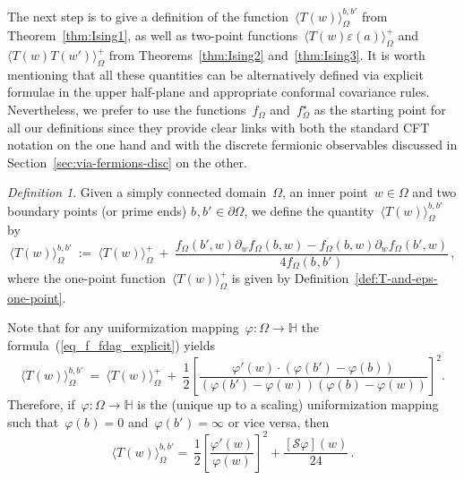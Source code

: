 \documentclass[reqno,11pt,a4paper]{amsart}
\theoremstyle{remark}
\newtheorem{definition}[proposition]{Definition}
\newcommand{\schw}{\mathcal{S}}
\renewcommand{\H}{\mathbb{H}}
\newcommand{\dob}{{b,b'}}
\newcommand{\f}{f_{\Omega}}
\newcommand{\fstar}{f_{\Omega}^\star}
\newcommand\Corr[1]{\langle #1 \rangle}
\newcommand\CorrO[2][+]{\Corr{#2}_\Omega^{#1}}
\begin{document}
The next step is to give a definition of the function~$\CorrO[\dob]{T(w)}$ from Theorem~\ref{thm:Ising1}, as well as two-point functions~$\CorrO{T(w)\varepsilon(a)}$ and~$\CorrO{T(w)T(w')}$ from Theorems~\ref{thm:Ising2} and~\ref{thm:Ising3}. It is worth mentioning that all these quantities can be alternatively defined via explicit formulae in the upper half-plane and appropriate conformal covariance rules. Nevertheless, we prefer to use the functions~$\f$ and~$\fstar$ as the starting point for all our definitions since they provide clear links with both the standard CFT notation on the one hand and with the discrete fermionic observables discussed in Section~\ref{sec:via-fermions-disc} on the other.

\begin{definition} \label{def:T-Dobrushin-expectation} Given a simply connected domain~$\Omega$, an inner point~$w\in\Omega$ and two boundary points (or prime ends) $b_{},b'_{}\in\partial\Omega$, we define the quantity~$\CorrO[\dob]{T(w)}$ by
\[
\CorrO[\dob]{T (w)} ~:=~
\CorrO{T(w)} ~+~ \frac{\f(b',w)\partial_w\f(b,w)-\f(b,w)\partial_w\f(b',w)}{4\f(b_{},b'_{})}\,,
\]
where %
the one-point function~$\CorrO{T(w)}$ is given by Definition~\ref{def:T-and-eps-one-point}.
\end{definition}

Note that for any uniformization mapping~$\varphi:\Omega\to\H$ the formula~(\ref{eq_f_fdag_explicit}) yields
\[
\CorrO[\dob]{T (w)} ~=~ \CorrO{T(w)} ~+~ \frac{1}{2}\left[\frac{\varphi'(w)\cdot(\varphi(b')-\varphi(b))} {(\varphi(b')-\varphi(w))(\varphi(b)-\varphi(w))}\right]^2.
\]
Therefore, if~$\varphi:\Omega\to\H$ is the (unique up to a scaling) uniformization mapping such that~\mbox{$\varphi(b_{})=0$} and~\mbox{$\varphi(b'_{})=\infty$} or vice versa, then
\begin{equation}
\label{eq_T_Dobrushin_explicit}
\CorrO[\dob]{T(w)}= \,\frac{1}{2}\left[\frac{\varphi'(w)}{\varphi(w)}\right]^2+\frac{[\schw\varphi](w)}{24}\,.
\end{equation}
\end{document}
